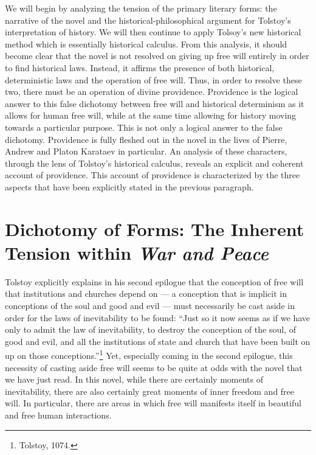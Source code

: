 \documentclass[12pt]{article}
\begin{document}
We will begin by analyzing the tension of the primary literary forms: the narrative of the novel and the historical-philosophical argument for Tolstoy's interpretation of history. We will then continue to apply Tolsoy's new historical method which is essentially historical calculus. From this analysis, it should become clear that the novel is not resolved on giving up free will entirely in order to find historical laws. Instead, it affirms the presence of both historical, deterministic laws and the operation of free will. Thus, in order to resolve these two, there must be an operation of divine providence. Providence is the logical answer to this false dichotomy between free will and historical determinism as it allows for human free will, while at the same time allowing for history moving towards a particular purpose. This is not only a logical answer to the false dichotomy. Providence is fully fleshed out in the novel in the lives of Pierre, Andrew and Platon Karataev in particular. An analysis of these characters, through the lens of Tolstoy's historical calculus, reveals an explicit and coherent account of providence. This account of providence is characterized by the three aspects that have been explicitly stated in the previous paragraph.

\section{Dichotomy of Forms: The Inherent Tension within \emph{War and Peace}} 
Tolstoy explicitly explains in his second epilogue that the conception of free will that institutions and churches depend on --- a conception that is implicit in conceptions of the soul and good and evil --- must necessarily be cast aside in order for the laws of inevitability to be found: ``Just so it now seems as if we have only to admit the law of inevitability, to destroy the conception of the soul, of good and evil, and all the institutions of state and church that have been built on up on those conceptions.''\footnote{Tolstoy, 1074.} Yet, especially coming in the second epilogue, this necessity of casting aside free will seems to be quite at odds with the novel that we have just read. In this novel, while there are certainly moments of inevitability, there are also certainly great moments of inner freedom and free will. In particular, there are areas in which free will manifests itself in beautiful and free human interactions.
 
\end{document}
